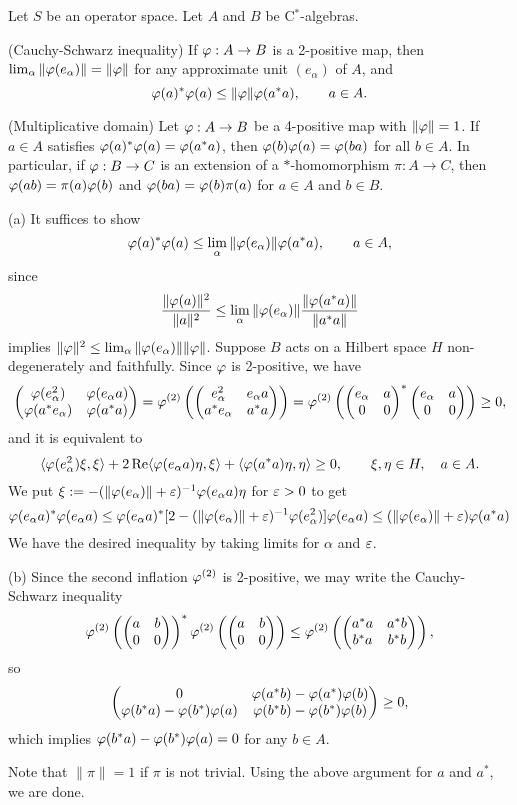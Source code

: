 \documentclass{../../large}
\begin{document}
\begin{prb}
Let $S$ be an operator space.
Let $A$ and $B$ be C$^*$-algebras.
\begin{parts}
\item (Cauchy-Schwarz inequality)
If $\varphi:A\to B$ is a 2-positive map, then $\lim_\alpha\|\varphi(e_\alpha)\|=\|\varphi\|$ for any approximate unit $(e_\alpha)$ of $A$, and
\[\varphi(a)^*\varphi(a)\le\|\varphi\|\varphi(a^*a),\qquad a\in A.\]
\item (Multiplicative domain)
Let $\varphi:A\to B$ be a 4-positive map with $\|\varphi\|=1$.
If $a\in A$ satisfies $\varphi(a)^*\varphi(a)=\varphi(a^*a)$, then $\varphi(b)\varphi(a)=\varphi(ba)$ for all $b\in A$.
In particular, if $\varphi:B\to C$ is an extension of a $*$-homomorphism $\pi:A\to C$, then $\varphi(ab)=\pi(a)\varphi(b)$ and $\varphi(ba)=\varphi(b)\pi(a)$ for $a\in A$ and $b\in B$.
\end{parts}
\end{prb}
\begin{pf}
(a)
It suffices to show
\[\varphi(a)^*\varphi(a)\le\lim_\alpha\|\varphi(e_\alpha)\|\varphi(a^*a),\qquad a\in A,\]
since
\[\frac{\|\varphi(a)\|^2}{\|a\|^2}\le\lim_\alpha\|\varphi(e_\alpha)\|\frac{\|\varphi(a^*a)\|}{\|a^*a\|}\]
implies $\|\varphi\|^2\le\lim_\alpha\|\varphi(e_\alpha)\|\|\varphi\|$.
Suppose $B$ acts on a Hilbert space $H$ non-degenerately and faithfully.
Since $\varphi$ is 2-positive, we have
\[\begin{pmatrix}\varphi(e_\alpha^2)&\varphi(e_\alpha a)\\\varphi(a^*e_\alpha)&\varphi(a^*a)\end{pmatrix}=\varphi^{(2)}\left(\begin{pmatrix}e_\alpha^2&e_\alpha a\\a^*e_\alpha&a^*a\end{pmatrix}\right)=\varphi^{(2)}\left(\begin{pmatrix}e_\alpha&a\\0&0\end{pmatrix}^*\begin{pmatrix}e_\alpha&a\\0&0\end{pmatrix}\right)\ge0,\]
and it is equivalent to
\[\langle\varphi(e_\alpha^2)\xi,\xi\rangle+2\operatorname{Re}\langle\varphi(e_\alpha a)\eta,\xi\rangle+\langle\varphi(a^*a)\eta,\eta\rangle\ge0,\qquad\xi,\eta\in H,\quad a\in A.\]
We put $\xi:=-(\|\varphi(e_\alpha)\|+\varepsilon)^{-1}\varphi(e_\alpha a)\eta$ for $\varepsilon>0$ to get
\[\varphi(e_\alpha a)^*\varphi(e_\alpha a)
\le\varphi(e_\alpha a)^*[2-(\|\varphi(e_\alpha)\|+\varepsilon)^{-1}\varphi(e_\alpha^2)]\varphi(e_\alpha a)
\le(\|\varphi(e_\alpha)\|+\varepsilon)\varphi(a^*a)\]
We have the desired inequality by taking limits for $\alpha$ and $\varepsilon$.

(b)
Since the second inflation $\varphi^{(2)}$ is 2-positive, we may write the Cauchy-Schwarz inequality
\[\varphi^{(2)}\left(\begin{pmatrix}a&b\\0&0\end{pmatrix}\right)^*\varphi^{(2)}\left(\begin{pmatrix}a&b\\0&0\end{pmatrix}\right)\le\varphi^{(2)}\left(\begin{pmatrix}a^*a&a^*b\\b^*a&b^*b\end{pmatrix}\right),\]
so
\[\begin{pmatrix}0&\varphi(a^*b)-\varphi(a^*)\varphi(b)\\\varphi(b^*a)-\varphi(b^*)\varphi(a)&\varphi(b^*b)-\varphi(b^*)\varphi(b)\end{pmatrix}\ge0,\]
which implies $\varphi(b^*a)-\varphi(b^*)\varphi(a)=0$ for any $b\in A$.

Note that $\|\pi\|=1$ if $\pi$ is not trivial.
Using the above argument for $a$ and $a^*$, we are done.
\end{pf}
\end{document}
